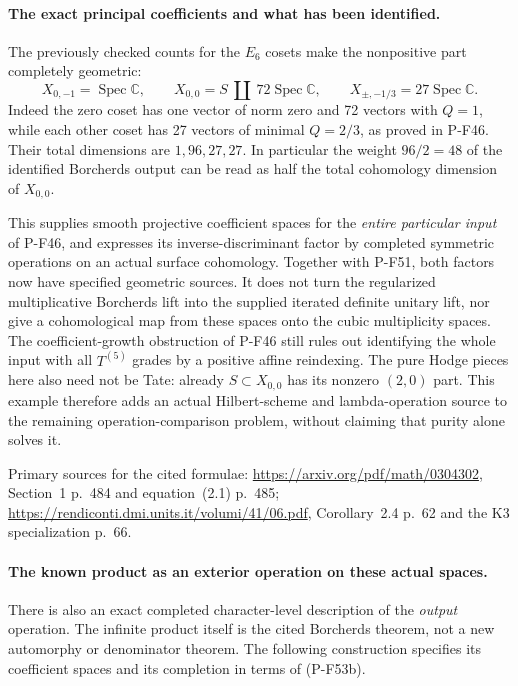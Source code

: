 \documentclass[11pt,a4paper]{article}
\begin{document}
\paragraph{The exact principal coefficients and what has been identified.}
The previously checked counts for the $E_6$ cosets
make the nonpositive part completely geometric:
\[
 X_{0,-1}=\operatorname{Spec}\mathbb C,\qquad
 X_{0,0}=S\ \coprod\ 72\operatorname{Spec}\mathbb C,
 \qquad
 X_{\pm,-1/3}=27\operatorname{Spec}\mathbb C.
                                                        \tag{P-F53g}
\]
Indeed the zero coset has one vector of norm zero
and 72 vectors with $Q=1$, while each other coset
has 27 vectors of minimal $Q=2/3$, as proved in
P-F46. Their total dimensions are $1,96,27,27$.
In particular the weight $96/2=48$ of the identified
Borcherds output can be read as half the total
cohomology dimension of $X_{0,0}$.

This supplies smooth projective coefficient spaces
for the \emph{entire particular input} of P-F46,
and expresses its inverse-discriminant factor by
completed symmetric operations on an actual
surface cohomology. Together with P-F51, both
factors now have specified geometric sources.
It does not turn the regularized multiplicative
Borcherds lift into the supplied iterated definite
unitary lift, nor give a cohomological map from
these spaces onto the cubic multiplicity spaces.
The coefficient-growth obstruction of P-F46 still
rules out identifying the whole input with all
$T^{(5)}$ grades by a positive affine reindexing.
The pure Hodge pieces here also need not be Tate:
already $S\subset X_{0,0}$ has its nonzero
$(2,0)$ part. This example therefore adds an
actual Hilbert-scheme and lambda-operation source
to the remaining operation-comparison problem,
without claiming that purity alone solves it.

Primary sources for the cited formulae:
\url{https://arxiv.org/pdf/math/0304302},
Section~1 p.~484 and equation~(2.1) p.~485;
\url{https://rendiconti.dmi.units.it/volumi/41/06.pdf},
Corollary~2.4 p.~62 and the K3 specialization p.~66.

\paragraph{The known product as an exterior operation on these actual spaces.}
There is also an exact completed character-level description of the
\emph{output} operation. The infinite product itself is the cited
Borcherds theorem, not a new automorphy or denominator theorem.
The following construction specifies its coefficient spaces and its
completion in terms of (P-F53b).
\end{document}
